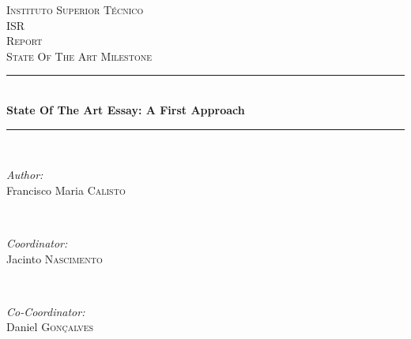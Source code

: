 \begin{titlepage}

\newcommand{\HRule}{\rule{\linewidth}{0.5mm}} %

\center %
 

\textsc{\LARGE Instituto Superior T\'{e}cnico}\\[1.5cm]
\textsc{\Large ISR}\\[0.5cm]
\textsc{\large Report}\\[0.25cm]
\textsc{\small State Of The Art Milestone}\\[0.25cm]


\HRule \\[0.5cm]
{ \large \bfseries State Of The Art Essay: A First Approach}\\[0.25cm] %
\HRule \\[0.5cm]
 

\begin{minipage}{0.4\textwidth}
\begin{flushleft} \large
\emph{Author:}\\
Francisco Maria \textsc{Calisto} %
\end{flushleft}
\end{minipage}
~
\begin{minipage}{0.4\textwidth}
\begin{flushright} \large
\emph{Coordinator:} \\
Jacinto \textsc{Nascimento} %
\end{flushright}
~
\begin{flushright} \large
\emph{Co-Coordinator:} \\
Daniel \textsc{Gon\c{c}alves} %
\end{flushright}
\end{minipage}\\[2cm]


\end{titlepage}

